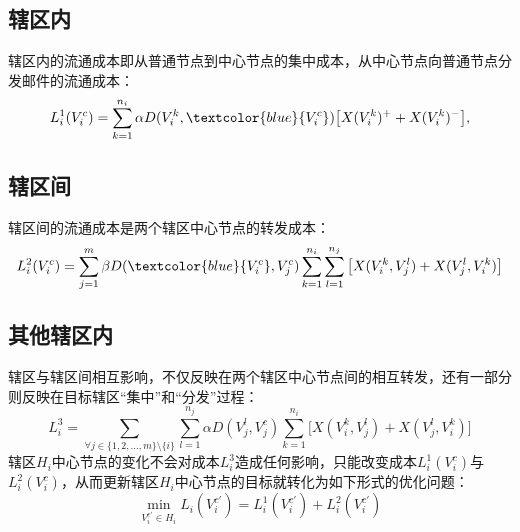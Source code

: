 \subsection{辖区内}
辖区内的流通成本即从普通节点到中心节点的集中成本，从中心节点向普通节点分发邮件的流通成本：
\begin{equation}
    L_i^1(V_i^c) = \sum\limits_{k=1}^{n_i} \alpha D(V_i^k, \textcolor{blue}{V_i^c}) \big[X(V_i^k)^{+} + X(V_i^k)^{-}\big],
\end{equation}

\subsection{辖区间}
辖区间的流通成本是两个辖区中心节点的转发成本：
\begin{equation}
    L_i^2(V_i^c) = \sum\limits_{j=1}^m \beta D(\textcolor{blue}{V_i^c}, V_j^c) \sum\limits_{k=1}^{n_i} \sum\limits_{l=1}^{n_j} \big[X(V_i^k, V_j^l) + X(V_j^l, V_i^k)\big]
\end{equation}

\subsection{其他辖区内}
辖区与辖区间相互影响，不仅反映在两个辖区中心节点间的相互转发，还有一部分则反映在目标辖区“集中”和“分发”过程：
\begin{equation}
    L_i^3 = \sum\limits_{\forall j\in \{1,2,\ldots, m\}\setminus \{i\}} \sum\limits_{l=1}^{n_j} \alpha D(V_j^l, V_j^c)\sum\limits_{k=1}^{n_i}\big[X(V_i^k, V_j^l) + X(V_j^l, V_i^k)\big]
\end{equation}
辖区$H_i$中心节点的变化不会对成本$L_i^3$造成任何影响，只能改变成本$L_i^1(V_i^c)$与$L_i^2(V_i^c)$，从而更新辖区$H_i$中心节点的目标就转化为如下形式的优化问题：
\begin{equation}
    \min\limits_{V_i^{c'} \in H_i} L_i(V_i^{c'}) = L_i^1(V_i^{c'}) + L_i^2(V_i^{c'})
\end{equation}

